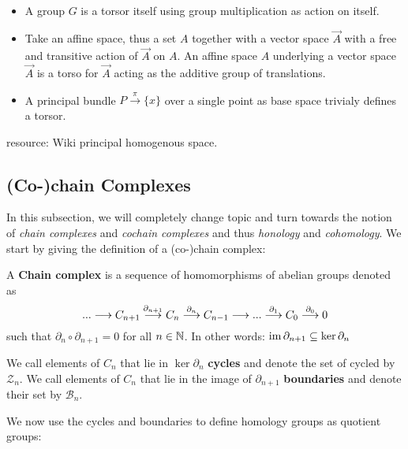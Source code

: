 \begin{example}~
\begin{itemize}
  \item A group $G$ is a torsor itself using group multiplication as action on itself.

  \item Take an affine space, thus a set $A$ together with a vector space $\vec{A}$ with a free and transitive action of $\vec{A}$ on $A$. An affine space $A$ underlying a vector space $\vec{A}$ is a torso for $\vec{A}$ acting as the additive group of translations.

  \item A principal bundle $P \overset{\pi}{\longrightarrow} \{x\}$ over a single point as base space trivialy defines a torsor.
\end{itemize}
\end{example}

resource: Wiki principal homogenous space.

\subsection{(Co-)chain Complexes}

In this subsection, we will completely change topic and turn towards the notion of \emph{chain complexes} and \emph{cochain complexes} and thus \emph{honology} and \emph{cohomology}. We start by giving the definition of a (co-)chain complex:

\begin{definition}
  A \textbf{Chain complex} is a sequence of homomorphisms of abelian groups denoted as
  $$ ... \longrightarrow C_{n+1} \overset{\partial_{n+1}}{\longrightarrow} C_{n} \overset{\partial_{n}}{\longrightarrow} C_{n-1} \longrightarrow ... \overset{\partial_{1}}{\longrightarrow} C_{0} \overset{\partial_{0}}{\longrightarrow} 0$$
  such that $\partial_n \circ \partial_{n+1} = 0$ for all $n \in \mathbb{N}$. In other words: $\operatorname{im} \partial_{n+1} \subseteq \ker \partial_n$
\end{definition}

\begin{definition}
  We call elements of $C_n$ that lie in $\ker \partial_n$ \textbf{cycles} and denote the set of cycled by $\mathcal{Z}_n$. We call elements of $C_n$ that lie in the image of $\partial_{n+1}$ \textbf{boundaries} and denote their set by $\mathcal{B}_n$.
\end{definition}

We now use the cycles and boundaries to define homology groups as quotient groups:

